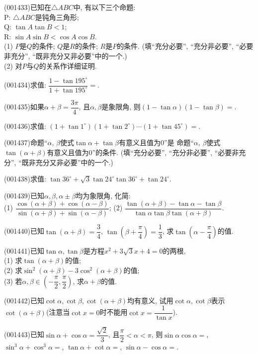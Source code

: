 \item (001433)已知在$\triangle ABC$中, 有以下三个命题:\\ 
P: $\triangle ABC$是钝角三角形;\\ 
Q: $\tan A\tan B<1$;\\ 
R: $\sin A\sin B<\cos A\cos B$.\\ 
(1) $P$是$Q$的条件; $Q$是$R$的条件; $R$是$P$的条件.
(填``充分必要'', ``充分非必要'', ``必要非充分'', ``既非充分又非必要''中的一个.)\\ 
(2) 对$P$与$Q$的关系作详细证明.
\item (001434)求值: $\dfrac{1-\tan 195^\circ}{1+\tan 195^\circ}=$.
\item (001435)如果$\alpha+\beta=\dfrac{3\pi}{4}$, 且$\alpha,\beta$是象限角, 则$(1-\tan\alpha)(1-\tan\beta)=$.
\item (001436)求值: $(1+\tan 1^\circ)(1+\tan 2^\circ)\cdots(1+\tan 45^\circ)=$.
\item (001437)命题``$\alpha$, $\beta$使式$\tan\alpha+\tan\beta$有意义且值为$0$''是
命题``$\alpha$, $\beta$使式$\tan(\alpha+\beta)$有意义且值为$0$''的条件.
(填``充分必要'', ``充分非必要'', ``必要非充分'', ``既非充分又非必要''中的一个.)
\item (001438)求值: $\tan 36^\circ+\sqrt{3}\tan 24^\circ\tan 36^\circ+\tan 24^\circ$.
\item (001439)已知$\alpha,\beta,\alpha\pm\beta$均为象限角, 化简:\\ 
(1) $\dfrac{\cos(\alpha+\beta)+\cos(\alpha-\beta)}{\sin(\alpha+\beta)+\sin(\alpha-\beta)}$; (2) $\dfrac{\tan(\alpha+\beta)-\tan\alpha-\tan\beta}{\tan\alpha\tan\beta\tan(\alpha+\beta)}$.
\item (001440)已知$\tan(\alpha+\beta)=\dfrac{3}{4}$, $\tan(\beta+\dfrac{\pi}{4})=\dfrac{1}{3}$,
求$\tan(\alpha-\dfrac{\pi}{4})$的值.
\item (001441)已知$\tan\alpha,\tan\beta$是方程$x^2+3\sqrt{3}x+4=0$的两根,\\ 
(1) 求$\tan(\alpha+\beta)$的值;\\ 
(2) 求$\sin^2(\alpha+\beta)-3\cos^2(\alpha+\beta)$的值;\\ 
(3) 若$\alpha,\beta\in\left(-\dfrac{\pi}{2},\dfrac{\pi}{2}\right)$, 求$\alpha+\beta$的值.
\item (001442)已知$\cot\alpha,\cot\beta,\cot(\alpha+\beta)$均有意义, 试用$\cot\alpha,\cot\beta$表示$\cot(\alpha+\beta)$(注意当$\cot x=0$时不能用$\cot x=\dfrac{1}{\tan x}$).
\item (001443)已知$\sin\alpha+\cos\alpha=\dfrac{\sqrt{2}}{3}$, 且$\dfrac{\pi}{2}<\alpha<\pi$, 则$\sin\alpha\cos\alpha=$, $\sin^3\alpha+\cos^3\alpha=$, $\tan\alpha+\cot\alpha=$, $\sin\alpha-\cos\alpha=$.
